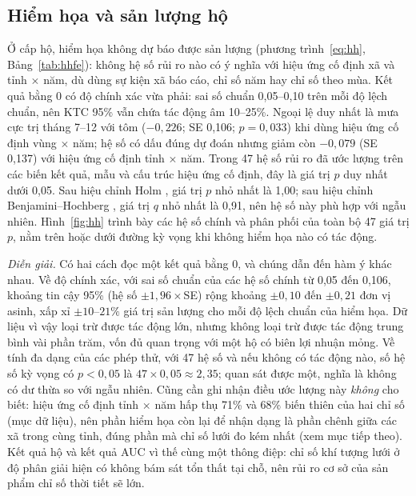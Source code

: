 \documentclass[12pt,a4paper]{article}
\begin{document}
\subsection{Hiểm họa và sản lượng hộ}

Ở cấp hộ, hiểm họa không dự báo được sản lượng (phương trình~\eqref{eq:hh}, Bảng~\ref{tab:hhfe}): không hệ số rủi ro nào có ý nghĩa với hiệu ứng cố định xã và tỉnh $\times$ năm, dù dùng sự kiện xã báo cáo, chỉ số năm hay chỉ số theo mùa. Kết quả bằng 0 có độ chính xác vừa phải: sai số chuẩn 0,05--0,10 trên mỗi độ lệch chuẩn, nên KTC 95\% vẫn chứa tác động âm 10--25\%. Ngoại lệ duy nhất là mưa cực trị tháng 7--12 với tôm ($-0{,}226$; SE 0,106; $p=0{,}033$) khi dùng hiệu ứng cố định vùng $\times$ năm; hệ số có dấu đúng dự đoán nhưng giảm còn $-0{,}079$ (SE 0,137) với hiệu ứng cố định tỉnh $\times$ năm. Trong 47 hệ số rủi ro đã ước lượng trên các biến kết quả, mẫu và cấu trúc hiệu ứng cố định, đây là giá trị $p$ duy nhất dưới 0,05. Sau hiệu chỉnh Holm \parencite{holm1979}, giá trị $p$ nhỏ nhất là 1,00; sau hiệu chỉnh Benjamini--Hochberg \parencite{benjamini1995}, giá trị $q$ nhỏ nhất là 0,91, nên hệ số này phù hợp với ngẫu nhiên. Hình~\ref{fig:hh} trình bày các hệ số chính và phân phối của toàn bộ 47 giá trị $p$, nằm trên hoặc dưới đường kỳ vọng khi không hiểm họa nào có tác động.

\textit{Diễn giải.} Có hai cách đọc một kết quả bằng 0, và chúng dẫn đến hàm ý khác nhau. Về độ chính xác, với sai số chuẩn của các hệ số chính từ 0,05 đến 0,106, khoảng tin cậy 95\% (hệ số $\pm 1{,}96\times$SE) rộng khoảng $\pm 0{,}10$ đến $\pm 0{,}21$ đơn vị asinh, xấp xỉ $\pm 10$--$21\%$ giá trị sản lượng cho mỗi độ lệch chuẩn của hiểm họa. Dữ liệu vì vậy loại trừ được tác động lớn, nhưng không loại trừ được tác động trung bình vài phần trăm, vốn đủ quan trọng với một hộ có biên lợi nhuận mỏng. Về tính đa dạng của các phép thử, với 47 hệ số và nếu không có tác động nào, số hệ số kỳ vọng có $p<0{,}05$ là $47\times 0{,}05\approx 2{,}35$; quan sát được một, nghĩa là không có dư thừa so với ngẫu nhiên. Cũng cần ghi nhận điều ước lượng này \emph{không} cho biết: hiệu ứng cố định tỉnh $\times$ năm hấp thụ 71\% và 68\% biến thiên của hai chỉ số (mục dữ liệu), nên phần hiểm họa còn lại để nhận dạng là phần chênh giữa các xã trong cùng tỉnh, đúng phần mà chỉ số lưới đo kém nhất (xem mục tiếp theo). Kết quả hộ và kết quả AUC vì thế cùng một thông điệp: chỉ số khí tượng lưới ở độ phân giải hiện có không bám sát tổn thất tại chỗ, nên rủi ro cơ sở của sản phẩm chỉ số thời tiết sẽ lớn.
\end{document}
